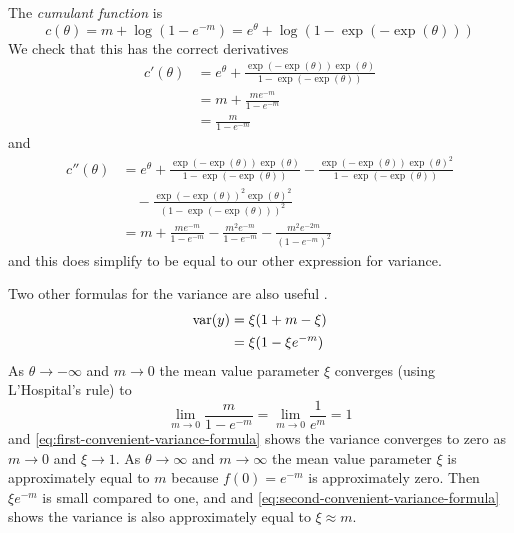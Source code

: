 The \emph{cumulant function} is
\begin{equation} \label{eq:zero-truncated-poisson-cumfun}
   c(\theta) = m + \log(1 - e^{- m})
   = e^\theta + \log(1 - \exp(- \exp(\theta)))
\end{equation}
We check that this has the correct derivatives
\begin{align*}
   c'(\theta)
   & =
   e^\theta 
   +
   \frac{\exp(- \exp(\theta)) \exp(\theta)}{1 - \exp(- \exp(\theta))}
   \\
   & =
   m + \frac{m e^{- m}}{1 - e^{- m}}
   \\
   & =
   \frac{m}{1 - e^{- m}}
\end{align*}
and
\begin{align*}
   c''(\theta)
   & =
   e^\theta 
   +
   \frac{\exp(- \exp(\theta)) \exp(\theta)}{1 - \exp(- \exp(\theta))}
   -
   \frac{\exp(- \exp(\theta)) \exp(\theta)^2}{1 - \exp(- \exp(\theta))}
   \\
   & \quad
   -
   \frac{\exp(- \exp(\theta))^2 \exp(\theta)^2}{(1 - \exp(- \exp(\theta)))^2}
   \\
   & =
   m + \frac{m e^{- m}}{1 - e^{- m}}
   - \frac{m^2 e^{- m}}{1 - e^{- m}}
   - \frac{m^2 e^{- 2 m}}{(1 - e^{- m})^2}
\end{align*}
and this does simplify to be equal to our other expression for variance.

Two other formulas for the variance are also useful \citep{geyer-3701}.
\begin{subequations}
\begin{align}
   \operatorname{var}(y) & = \xi (1 + m - \xi)
   \label{eq:first-convenient-variance-formula}
   \\
   & = \xi (1 - \xi e^{- m})
   \label{eq:second-convenient-variance-formula}
\end{align}
\end{subequations}
As $\theta \to - \infty$ and $m \to 0$ the mean value parameter $\xi$ converges
(using L'Hospital's rule) to
$$
   \lim_{m \to 0} \frac{m}{1 - e^{- m}} = \lim_{m \to 0} \frac{1}{e^{m}} = 1
$$
and \eqref{eq:first-convenient-variance-formula} shows the variance converges
to zero as $m \to 0$ and $\xi \to 1$.
As $\theta \to \infty$ and $m \to \infty$ the mean value parameter $\xi$
is approximately equal to $m$ because $f(0) = e^{- m}$ is approximately zero.
Then $\xi e^{- m}$ is small compared to one, and
and \eqref{eq:second-convenient-variance-formula} shows the variance is
also approximately equal to $\xi \approx m$.

